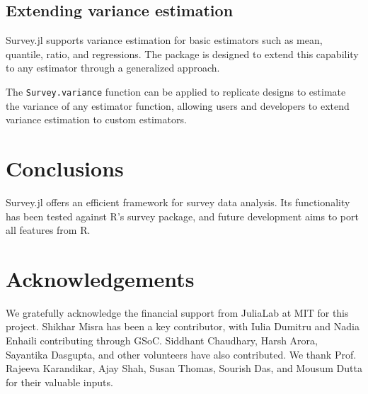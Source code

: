 \documentclass{juliacon}
\begin{document}
\subsection{Extending variance estimation}

Survey.jl supports variance estimation for basic estimators such as mean, quantile, ratio, and regressions. The package is designed to extend this capability to any estimator through a generalized approach.

The \verb|Survey.variance| function can be applied to replicate designs to estimate the variance of any estimator function, allowing users and developers to extend variance estimation to custom estimators.




\section{Conclusions}
Survey.jl offers an efficient framework for survey data analysis. Its functionality has been tested against R's survey package, and future development aims to port all features from R.

\section{Acknowledgements}
We gratefully acknowledge the financial support from JuliaLab at MIT for this project. Shikhar Misra has been a key contributor, with Iulia Dumitru and Nadia Enhaili contributing through GSoC. Siddhant Chaudhary, Harsh Arora, Sayantika Dasgupta, and other volunteers have also contributed. We thank Prof. Rajeeva Karandikar, Ajay Shah, Susan Thomas, Sourish Das, and Mousum Dutta for their valuable inputs.


\end{document}
